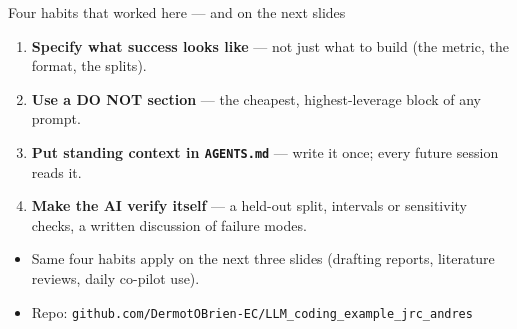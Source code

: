 \documentclass[aspectratio=169,11pt]{beamer}
\begin{document}
\begin{frame}{Four habits that worked here --- and on the next slides}
  \begin{enumerate}
    \item \textbf{Specify what success looks like} --- not just what to build (the metric,
      the format, the splits).
    \item \textbf{Use a DO NOT section} --- the cheapest, highest-leverage block of any prompt.
    \item \textbf{Put standing context in \texttt{AGENTS.md}} --- write it once;
      every future session reads it.
    \item \textbf{Make the AI verify itself} --- a held-out split, intervals or sensitivity
      checks, a written discussion of failure modes.
  \end{enumerate}
  \vspace{4pt}
  \begin{itemize}
    \item Same four habits apply on the next three slides (drafting reports, literature
      reviews, daily co-pilot use).
    \item Repo: \texttt{github.com/DermotOBrien-EC/LLM\_coding\_example\_jrc\_andres}
  \end{itemize}
\end{frame}
\end{document}
